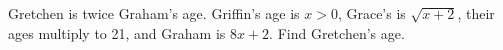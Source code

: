 Gretchen is twice Graham's age. Griffin's age is $x>0$, Grace's is $\sqrt{x+2}$, their ages multiply to 21, and Graham is $8x+2$. Find Gretchen's age.
